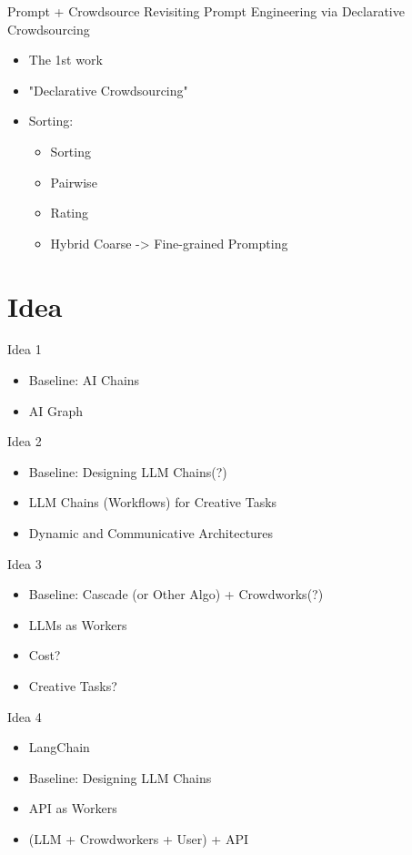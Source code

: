 \documentclass{beamer}
\begin{document}
\begin{frame}{Prompt + Crowdsource}
    Revisiting Prompt Engineering via Declarative Crowdsourcing
    \begin{itemize}
        \item The 1st work
        \item "Declarative Crowdsourcing"
        \item Sorting:
        \begin{itemize}
            \item Sorting
            \item Pairwise
            \item Rating
            \item Hybrid Coarse -> Fine-grained Prompting
        \end{itemize}
    \end{itemize}
\end{frame}

\section{Idea}

\begin{frame}{Idea 1}
    \begin{itemize}
        \item Baseline: AI Chains
        \item AI Graph
    \end{itemize}
\end{frame}

\begin{frame}{Idea 2}
    \begin{itemize}
        \item Baseline: Designing LLM Chains(?)
        \item LLM Chains (Workflows) for Creative Tasks
        \item Dynamic and Communicative Architectures
    \end{itemize}
\end{frame}

\begin{frame}{Idea 3}
    \begin{itemize}
        \item Baseline: Cascade (or Other Algo) + Crowdworks(?)
        \item LLMs as Workers
        \item Cost?
        \item Creative Tasks?
    \end{itemize}
\end{frame}

\begin{frame}{Idea 4}
    \begin{itemize}
        \item LangChain
        \item Baseline: Designing LLM Chains
        \item API as Workers
        \item (LLM + Crowdworkers + User) + API
    \end{itemize}
\end{frame}
\end{document}
